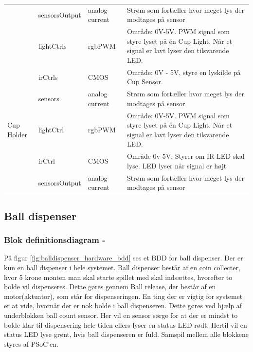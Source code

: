 \documentclass[Arkitektur/System_main.tex]{subfiles}
\begin{document}
\begin{longtable}{|L{0.2\textwidth}|L{0.2\textwidth}|L{0.2\textwidth}|L{0.4\textwidth}|}
                        & sensorsOutput & analog current    & Strøm som fortæller hvor meget lys der modtages på sensor \\ 
                        & lightCtrls    & rgbPWM            & Område: 0V-5V. PWM signal som styre lyset på én Cup Light. Når et signal er lavt lyser den tilsvarende LED.\\ 
                        & irCtrls       & CMOS              & Område: 0V - 5V, styre en lyskilde på Cup Sensor. \\ 
                        & sensors       & analog current    & Strøm som fortæller hvor meget lys der modtages på sensor \\ \hline
Cup Holder              & lightCtrl     & rgbPWM            & Område: 0V-5V. PWM signal som styre lyset på én Cup Light. Når et signal er lavt lyser den tilsvarende LED. \\ \hline
                        & irCtrl        & CMOS              & Område 0v-5V. Styrer om IR LED skal lyse. LED lyser når signal er højt  \\ \hline
                        & sensorsOutput & analog current    & Strøm som fortæller hvor meget lys der modtages på sensor \\ \hline
\end{longtable}

\subsection{Ball dispenser} \label{sec:balldispenser_hardware}
\subsubsection{Blok definitionsdiagram - } \label{sec:balldispenser_hardware_bdd}

På figur \ref{fig:balldispenser_hardware_bdd} ses et BDD for ball dispenser. Der er kun en ball dispenser i hele systemet. Ball dispenser består af en coin collecter, hvor 5 krone mønten man skal starte spillet med skal indsættes, hvorefter to bolde vil dispenseres. Dette gøres gennem Ball release, der består af en motor(aktuator), som står for dispenseringen. En ting der er vigtig for systemet er at vide, hvornår der er nok bolde i ball dispenseren. Dette gøres ved hjælp af underblokken ball count sensor. Her vil en sensor sørge for at der er mindst to bolde klar til dispensering hele tiden ellers lyser en status LED rødt. Hertil vil en status LED lyse grønt, hvis ball dispenseren er fuld. Samspil mellem alle blokkene styres af PSoC'en.
\end{document}
